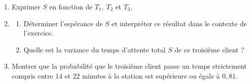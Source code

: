 \medskip

\begin{enumerate}
\item Exprimer $S$ en fonction de $T_1,\: T_2$ et $T_3$.
\item 
	\begin{enumerate}
		\item Déterminer l'espérance de $S$ et interpréter ce résultat dans le contexte de l'exercice. 
		\item Quelle est la variance du temps d'attente total $S$ de ce troisième client ?
	\end{enumerate}
\item Montrer que la probabilité que le troisième client passe un temps strictement compris entre $14$ et $22$ minutes à la station est supérieure ou égale à $0,81$.
\end{enumerate}

\bigskip
